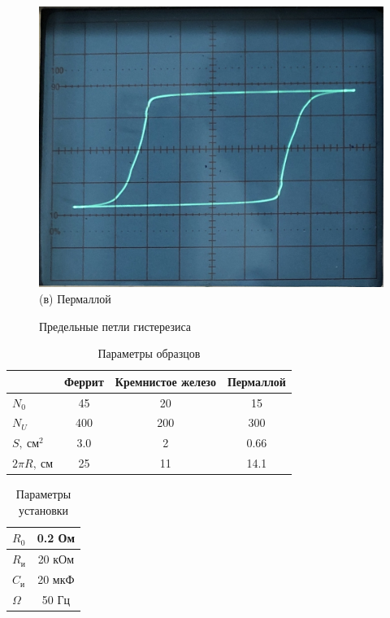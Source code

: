 \documentclass[12pt,a4paper]{article}
\begin{document}
\begin{figure}[H]
	\begin{minipage}{0.33\linewidth}
		\centering
		\includegraphics[width=0.9\linewidth]{pics/pred_perm.jpg}
		(в) Пермаллой
	\end{minipage}

	\caption{Предельные петли гистерезиса}
\end{figure}

\begin{table}[H]
    \centering
    \begin{tabular}[]{|l|c|c|c|}
        \hline
        &Феррит&Кремнистое железо&Пермаллой \\ \hline
        $N_0$ &45&20&15 \\ \hline
        $N_U$ &400&200&300 \\ \hline
        $S,\ см^2$ &3.0&2&0.66 \\ \hline
        $2\pi R,\ см$ &25&11&14.1 \\ \hline
    \end{tabular}
    \caption{Параметры образцов}
\end{table}

\begin{table}[H]
    \centering
    \begin{tabular}[]{|l|c|}
        \hline
        $R_0$ &0.2 Ом\\ \hline
        $R_и$ &20 кОм \\ \hline
        $C_и$ &20 мкФ\\ \hline
        $\Omega$ &50 Гц \\ \hline
    \end{tabular}
    \caption{Параметры установки}
\end{table}
\end{document}
